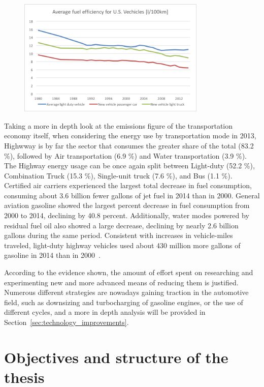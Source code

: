 \documentclass[12pt]{report}   %
\begin{document}
\begin{figure}[ht]
  \centering
  \includegraphics[width=0.8\textwidth]{figures/introduction/average_fuel_efficiency.png}
  \caption{\label{fig:average_fuel_efficiency} }
\end{figure}

Taking a more in depth look at the emissions figure of the transportation economy itself, when considering the energy use by transportation mode in 2013, Highwway is by far the sector that consumes the greater share of the total (83.2 \%), followed by Air transportation (6.9 \%) and Water transportation (3.9 \%). The Highway energy usage can be once again split between Light-duty (52.2 \%), Combination Truck (15.3 \%), Single-unit truck (7.6 \%), and Bus (1.1 \%). Certified air carriers experienced the largest total decrease in fuel consumption, consuming about 3.6 billion fewer gallons of jet fuel in 2014 than in 2000. General aviation gasoline showed the largest percent decrease in fuel consumption from 2000 to 2014, declining by 40.8 percent. Additionally, water modes powered by residual fuel oil also showed a large decrease, declining by nearly 2.6 billion gallons during the same period. Consistent with increases in vehicle-miles traveled, light-duty highway vehicles used about 430 million more gallons of gasoline in 2014 than in 2000~\cite{BureauofTransportationStatistics2016a}.

According to the evidence shown, the amount of effort spent on researching and experimenting new and more advanced means of reducing them is justified. Numerous different strategies are nowadays gaining traction in the automotive field, such as downsizing and turbocharging of gasoline engines, or the use of different cycles, and a more in depth analysis will be provided in Section~\ref{sec:technology_improvements}.

\section{Objectives and structure of the thesis}
\end{document}

